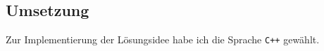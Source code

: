 %
%
%
%
%
\subsection{Umsetzung}

Zur Implementierung der Lösungsidee habe ich die Sprache \texttt{C++} gewählt.

